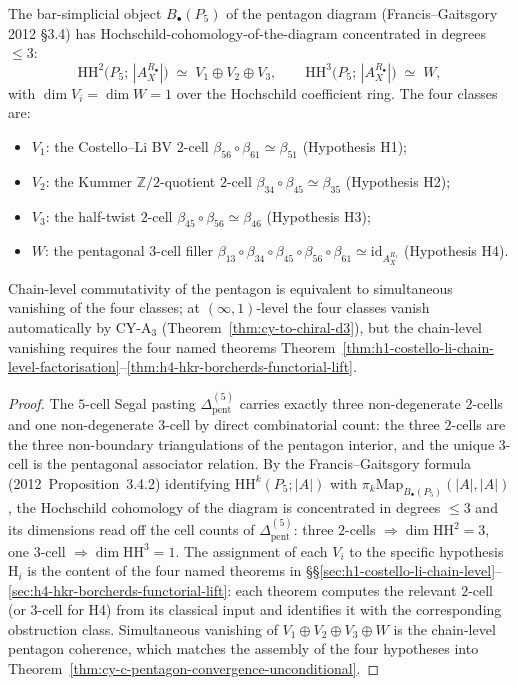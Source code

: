 \begin{proposition}
\label{prop:h1-h4-hochschild-cells}
The bar-simplicial object $B_\bullet(P_5)$ of the pentagon diagram
(Francis--Gaitsgory 2012 \S3.4) has Hochschild-cohomology-of-the-diagram
concentrated in degrees $\le 3$:
\[
 \mathrm{HH}^2\bigl(P_5;\, |A_X^{R_\bullet}|\bigr) \;\simeq\; V_1 \oplus V_2 \oplus V_3,
 \qquad
 \mathrm{HH}^3\bigl(P_5;\, |A_X^{R_\bullet}|\bigr) \;\simeq\; W,
\]
with $\dim V_i = \dim W = 1$ over the Hochschild coefficient ring. The four classes are:
\begin{itemize}
 \item $V_1$: the Costello--Li BV $2$-cell $\beta_{56} \circ \beta_{61} \simeq \beta_{51}$
 (Hypothesis H1);
 \item $V_2$: the Kummer $\mathbb{Z}/2$-quotient $2$-cell $\beta_{34} \circ \beta_{45} \simeq \beta_{35}$
 (Hypothesis H2);
 \item $V_3$: the half-twist $2$-cell $\beta_{45} \circ \beta_{56} \simeq \beta_{46}$
 (Hypothesis H3);
 \item $W$: the pentagonal $3$-cell filler
 $\beta_{13} \circ \beta_{34} \circ \beta_{45} \circ \beta_{56} \circ \beta_{61}
 \simeq \mathrm{id}_{A_X^{R_1}}$ (Hypothesis H4).
\end{itemize}
Chain-level commutativity of the pentagon is equivalent to simultaneous vanishing of the
four classes; at $(\infty,1)$-level the four classes vanish automatically by
CY-A$_3$ (Theorem~\ref{thm:cy-to-chiral-d3}), but the chain-level vanishing requires the
four named theorems
Theorem~\ref{thm:h1-costello-li-chain-level-factorisation}--\ref{thm:h4-hkr-borcherds-functorial-lift}.
\end{proposition}

\begin{proof}
The $5$-cell Segal pasting $\Delta^{(5)}_{\mathrm{pent}}$ carries exactly three non-degenerate
$2$-cells and one non-degenerate $3$-cell by direct combinatorial count: the three $2$-cells are the
three non-boundary triangulations of the pentagon interior, and the unique $3$-cell is the pentagonal
associator relation. By the Francis--Gaitsgory formula (2012~Proposition~3.4.2) identifying
$\mathrm{HH}^k(P_5; |A|)$ with $\pi_k \mathrm{Map}_{B_\bullet(P_5)}(|A|, |A|)$, the Hochschild
cohomology of the diagram is concentrated in degrees $\le 3$ and its dimensions read off the cell
counts of $\Delta^{(5)}_{\mathrm{pent}}$: three $2$-cells $\Rightarrow \dim \mathrm{HH}^2 = 3$, one
$3$-cell $\Rightarrow \dim \mathrm{HH}^3 = 1$. The assignment of each $V_i$ to the specific
hypothesis H$_i$ is the content of the four named theorems in
\S\S\ref{sec:h1-costello-li-chain-level}--\ref{sec:h4-hkr-borcherds-functorial-lift}: each
theorem computes the relevant $2$-cell (or $3$-cell for H4) from its classical input and identifies
it with the corresponding obstruction class. Simultaneous vanishing of $V_1 \oplus V_2 \oplus V_3 \oplus W$
is the chain-level pentagon coherence, which matches the assembly of the four hypotheses into
Theorem~\ref{thm:cy-c-pentagon-convergence-unconditional}.
\end{proof}

